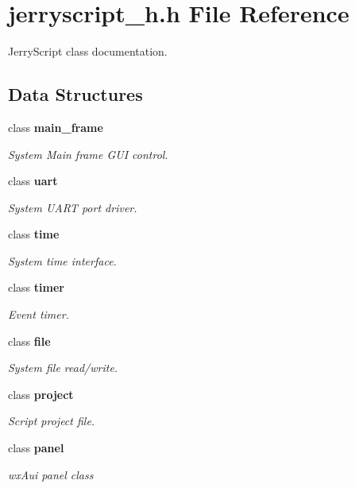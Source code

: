 \section{jerryscript\+\_\+h.\+h File Reference}
\label{jerryscript__h_8h}


Jerry\+Script class documentation.  


\subsection*{Data Structures}
\begin{DoxyCompactItemize}
\item 
class \textbf{ main\+\_\+frame}
\begin{DoxyCompactList}\small\item\em System Main frame G\+UI control. \end{DoxyCompactList}\item 
class \textbf{ uart}
\begin{DoxyCompactList}\small\item\em System U\+A\+RT port driver. \end{DoxyCompactList}\item 
class \textbf{ time}
\begin{DoxyCompactList}\small\item\em System time interface. \end{DoxyCompactList}\item 
class \textbf{ timer}
\begin{DoxyCompactList}\small\item\em Event timer. \end{DoxyCompactList}\item 
class \textbf{ file}
\begin{DoxyCompactList}\small\item\em System file read/write. \end{DoxyCompactList}\item 
class \textbf{ project}
\begin{DoxyCompactList}\small\item\em Script project file. \end{DoxyCompactList}\item 
class \textbf{ panel}
\begin{DoxyCompactList}\small\item\em wx\+Aui panel class \end{DoxyCompactList}\item 

\end{DoxyCompactItemize}

